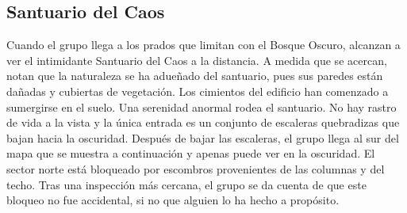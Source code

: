 \subsection*{Santuario del Caos}
Cuando el grupo llega a los prados que limitan con el Bosque Oscuro, alcanzan a ver el intimidante Santuario del Caos a la distancia. A medida que se acercan, notan que la naturaleza se ha adueñado del santuario, pues sus paredes están dañadas y cubiertas de vegetación. Los cimientos del edificio han comenzado a sumergirse en el suelo. Una serenidad anormal rodea el santuario. No hay rastro de vida a la vista y la única entrada es un conjunto de escaleras quebradizas que bajan hacia la oscuridad. Después de bajar las escaleras, el grupo llega al sur del mapa que se muestra a continuación y apenas puede ver en la oscuridad. El sector norte está bloqueado por escombros provenientes de las columnas y del techo. Tras una inspección más cercana, el grupo se da cuenta de que este bloqueo no fue accidental, si no que alguien lo ha hecho a propósito.
\vspace{0.1cm}

